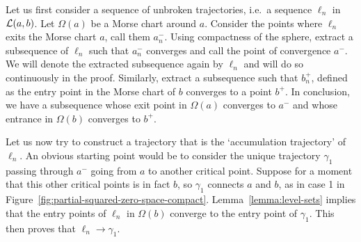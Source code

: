 \begin{myproof}
    Let us first consider a sequence of unbroken trajectories, i.e.\ a sequence $\ell_n$ in $\mathcal L(a, b)$.
    Let $\Omega(a)$ be a Morse chart around $a$.
    Consider the points where $\ell_n$ exits the Morse chart $a$, call them $a_n^{-}$.
    Using compactness of the sphere, extract a subsequence of $\ell_n$ such that $a_{n}^{-}$ converges and call the point of convergence $a^{-}$.
    We will denote the extracted subsequence again by $\ell_n$ and will do so continuously in the proof.
    Similarly, extract a subsequence such that $b_n^{+}$, defined as the entry point in the Morse chart of $b$ converges to a point $b^{+}$.
    In conclusion, we have a subsequence whose exit point in $\Omega(a)$  converges to $a^{-}$ and whose entrance in $\Omega(b)$ converges to  $b^{+}$.

    Let us now try to construct a trajectory that is the `accumulation trajectory' of $\ell_n$.
    An obvious starting point would be to consider the unique trajectory $\gamma_1$ passing through $a^{-}$ going from $a$ to another critical point.
    Suppose for a moment that this other critical points is in fact $b$, so $\gamma_1$ connects  $a$ and  $b$, as in case 1 in Figure~\ref{fig:partial-squared-zero-space-compact}.
    Lemma~\ref{lemma:level-sets} implies that the entry points of $\ell_n$ in $\Omega(b)$ converge to the entry point of $\gamma_1$. This then proves that $\ell_n \to  \gamma_1$.


\end{myproof}
